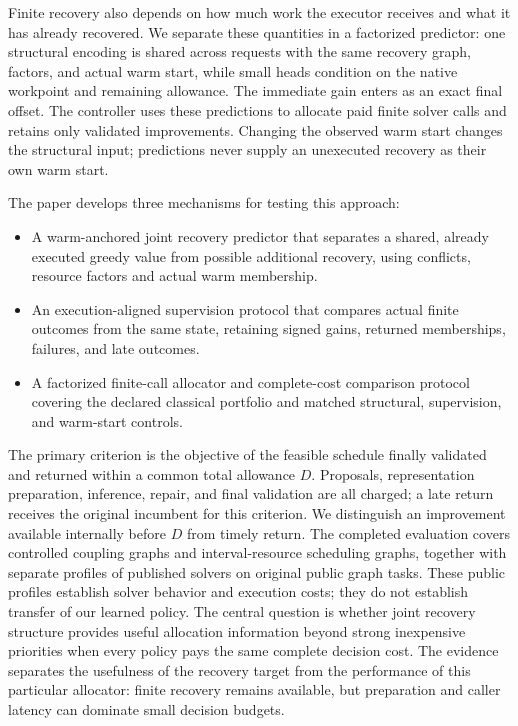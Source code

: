 Finite recovery also depends on how much work the executor receives and
what it has already recovered. We separate these quantities in a factorized
predictor: one structural encoding is shared across requests with the same
recovery graph, factors, and actual warm start, while small heads condition
on the native workpoint and remaining allowance. The immediate gain enters
as an exact final offset. The controller uses these predictions to allocate
paid finite solver calls and retains only validated improvements. Changing
the observed warm start changes the structural input; predictions never
supply an unexecuted recovery as their own warm start.

The paper develops three mechanisms for testing this approach:
\begin{itemize}
  \item A warm-anchored joint recovery predictor that separates a shared,
  already executed greedy value from possible additional recovery, using
  conflicts, resource factors and actual warm membership.
  \item An execution-aligned supervision protocol that compares actual
  finite outcomes from the same state, retaining signed gains, returned
  memberships, failures, and late outcomes.
  \item A factorized finite-call allocator and complete-cost comparison
  protocol covering the declared classical portfolio and matched structural,
  supervision, and warm-start controls.
\end{itemize}

The primary criterion is the objective of the feasible schedule finally
validated and returned within a common total allowance $D$. Proposals,
representation preparation, inference, repair, and final validation are all
charged; a late return receives the original incumbent for this criterion.
We distinguish an improvement available internally before $D$ from timely
return. The completed evaluation covers controlled
coupling graphs and interval-resource scheduling graphs, together with
separate profiles of published solvers on original public graph tasks.
These public profiles establish solver behavior and execution costs;
they do not establish transfer of our learned policy. The central question is whether joint recovery
structure provides useful allocation information beyond strong inexpensive
priorities when every policy pays the same complete decision cost.
The evidence separates the usefulness of the recovery target from the
performance of this particular allocator: finite recovery remains available,
but preparation and caller latency can dominate small decision budgets.

